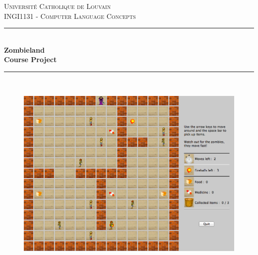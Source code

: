 \documentclass[11pt,a4paper]{article}
\begin{document}
	
\begin{titlepage}
\newcommand{\HRule}{\rule{\linewidth}{0.5mm}} %
\centering %
 
\null
\textsc{\Large Université Catholique de Louvain}\\  [0.3cm] %
\textsc{\large INGI1131 - Computer Language Concepts}\\ [0.7 cm]%


\HRule \\[0.2cm]
{ \LARGE \bfseries Zombieland\\%
\large \bfseries Course Project} \\[0.2cm]
\HRule \\[0.2cm]

 
\begin{figure}[!h]
	\begin{center}
		\includegraphics[width=\textwidth]{screenshot.PNG}
	\end{center}
\end{figure}



\end{titlepage}
\end{document}
